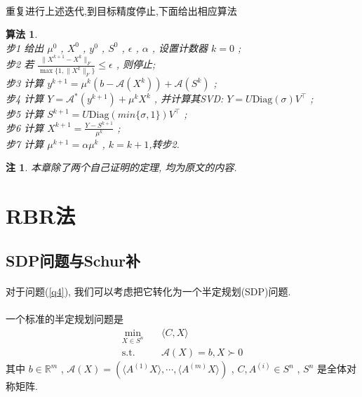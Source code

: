 \documentclass[a4paper, UTF8]{ctexart}				%
\newtheorem{remark}{\bf 注}
\newtheorem{algo}{\bf 算法}
\numberwithin{equation}{section}				%
\newcommand{\upcite}[1]{\textsuperscript{\textsuperscript{\cite{#1}}}}
\begin{document}
			\paragraph{}
				\quad 重复进行上述迭代,到目标精度停止,下面给出相应算法
				\begin{algo}
					\quad\\
					步1 \quad 给出 $\mu^0$ , $X^0$ , $y^0$ , $S^0$ , $\epsilon$ , $\alpha$ , 设置计数器 $k=0$ ;\\
					步2 \quad 若 $\frac{\lVert{X^{k + 1} - X^k}\rVert_F}{\max \{1, \lVert{X^k}\rVert_F\}} \leq \epsilon$ , 则停止;\\
					步3 \quad 计算 $y^{k + 1} = \mu^k (b - \mathcal{A}(X^k)) + \mathcal{A}(S^k)$ ;\\
					步4 \quad 计算 $Y = \mathcal{A}^*(y^{k + 1}) + \mu^k X^k$ , 并计算其SVD: $Y = U \text{Diag}(\sigma) V^\top$ ;\\
					步5 \quad 计算 $S^{k + 1} = U \text{Diag}(min \{\sigma, 1\}) V^\top$ ;\\
					步6 \quad 计算 $X^{k + 1} = \frac{Y - S^{k + 1}}{\mu^k}$ ;\\
					步7 \quad 计算 $\mu^{k + 1} = \alpha \mu^k$ , $k = k + 1$,转步2.\\
				\end{algo}

		\begin{remark}
			本章除了两个自己证明的定理, 均为原文\upcite{goldfarb2009solving}的内容.
		\end{remark}

	\section{RBR法}
		\subsection{SDP问题与Schur补}
			\paragraph{}
				\quad 对于问题(\ref{q4}), 我们可以考虑把它转化为一个半定规划(SDP)问题.

			\paragraph{}
				\quad 一个标准的半定规划问题是
				\begin{equation}
					\begin{split}\label{SDP}
						\min_{X \in S^n} \quad
							& \langle{C, X}\rangle\\
						\text{s.t.} \quad
							& \mathcal{A}(X) = b, X \succ 0
					\end{split}
				\end{equation}
				其中 $b \in \mathbb{R}^{m}$ , $\mathcal{A}(X) = (\langle{A^{(1)} X}\rangle, \cdots, \langle{A^{(m)} X}\rangle)$ , $C, A^{(i)}\in S^n$ , $S^n$ 是全体对称矩阵.
\end{document}
